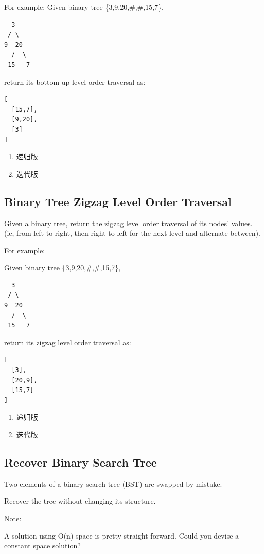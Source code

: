 \documentclass[12pt]{book}
\begin{document}
For example:
Given binary tree \{3,9,20,\#,\#,15,7\},
\lstset{language=java,label= ,caption= ,numbers=none}
\begin{lstlisting}
  3
 / \
9  20
  /  \
 15   7
\end{lstlisting}
return its bottom-up level order traversal as:
\lstset{language=java,label= ,caption= ,numbers=none}
\begin{lstlisting}
[
  [15,7],
  [9,20],
  [3]
]
\end{lstlisting}
\begin{enumerate}
\item 递归版
\label{sec-4-1-5-1}
\item 迭代版
\label{sec-4-1-5-2}
\end{enumerate}


\subsection{Binary Tree Zigzag Level Order Traversal}
\label{sec-4-1-6}
Given a binary tree, return the zigzag level order traversal of its nodes' values. (ie, from left to right, then right to left for the next level and alternate between).

For example:

Given binary tree \{3,9,20,\#,\#,15,7\},
\lstset{language=java,label= ,caption= ,numbers=none}
\begin{lstlisting}
  3
 / \
9  20
  /  \
 15   7
\end{lstlisting}
return its zigzag level order traversal as:
\lstset{language=java,label= ,caption= ,numbers=none}
\begin{lstlisting}
[
  [3],
  [20,9],
  [15,7]
]
\end{lstlisting}
\begin{enumerate}
\item 递归版
\label{sec-4-1-6-1}
\item 迭代版
\label{sec-4-1-6-2}
\end{enumerate}

\subsection{Recover Binary Search Tree}
\label{sec-4-1-7}
Two elements of a binary search tree (BST) are swapped by mistake.

Recover the tree without changing its structure.

Note:

A solution using O(n) space is pretty straight forward. Could you devise a constant space solution?
\end{document}
